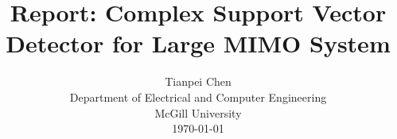 \documentclass[12pt, draftclsnofoot, onecolumn]{IEEEtran}
\begin{document}
\begin{spacing}{2}
%
\title{Report: Complex Support Vector Detector for Large MIMO System}

%
%
%
\author{Tianpei Chen\\
Department of Electrical and Computer Engineering\\
McGill University\\
\today}


% 
%




\end{spacing}
\end{document}
